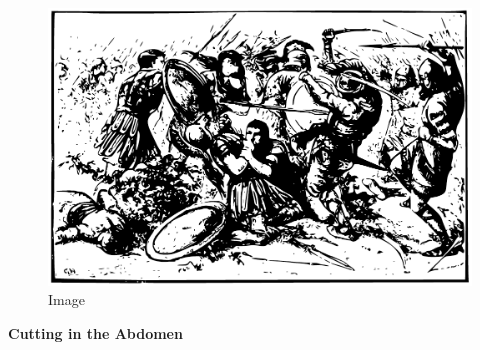\begin{figure}
\centering
\includegraphics{./images/combat04.pdf}
\caption{Image}
\end{figure}

\textbf{Cutting in the Abdomen}

